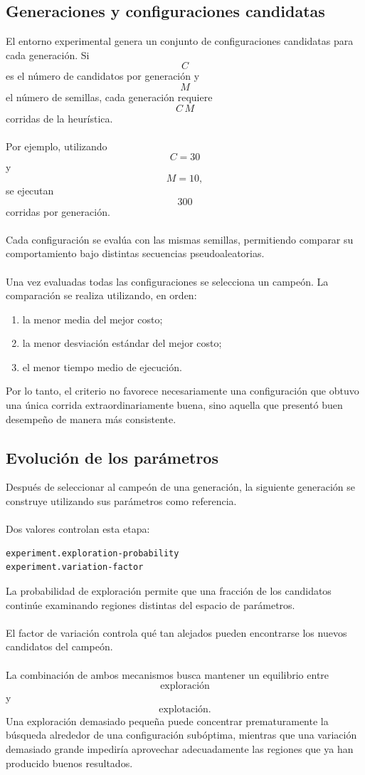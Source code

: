 \documentclass[12pt]{article}
\begin{document}
\subsection{Generaciones y configuraciones candidatas}

El entorno experimental genera un conjunto de configuraciones candidatas
para cada generación.
Si
\[
    C
\]
es el número de candidatos por generación y
\[
    M
\]
el número de semillas, cada generación requiere
\[
    C\,M
\]
corridas de la heurística.
\\\\
Por ejemplo, utilizando
\[
    C=30
\]
y
\[
    M=10,
\]
se ejecutan
\[
    300
\]
corridas por generación.
\\\\
Cada configuración se evalúa con las mismas semillas, permitiendo comparar
su comportamiento bajo distintas secuencias pseudoaleatorias.
\\\\
Una vez evaluadas todas las configuraciones se selecciona un campeón. La
comparación se realiza utilizando, en orden:
\begin{enumerate}
    \item la menor media del mejor costo;
    \item la menor desviación estándar del mejor costo;
    \item el menor tiempo medio de ejecución.
\end{enumerate}
Por lo tanto, el criterio no favorece necesariamente una configuración que
obtuvo una única corrida extraordinariamente buena, sino aquella que
presentó buen desempeño de manera más consistente.

\subsection{Evolución de los parámetros}

Después de seleccionar al campeón de una generación, la siguiente
generación se construye utilizando sus parámetros como referencia.
\\\\
Dos valores controlan esta etapa:
\begin{verbatim}
experiment.exploration-probability
experiment.variation-factor
\end{verbatim}
La probabilidad de exploración permite que una fracción de los candidatos
continúe examinando regiones distintas del espacio de parámetros.
\\\\
El factor de variación controla qué tan alejados pueden encontrarse los
nuevos candidatos del campeón.
\\\\
La combinación de ambos mecanismos busca mantener un equilibrio entre
\[
    \text{exploración}
\]
y
\[
    \text{explotación}.
\]
Una exploración demasiado pequeña puede concentrar prematuramente la
búsqueda alrededor de una configuración subóptima, mientras que una
variación demasiado grande impediría aprovechar adecuadamente las regiones
que ya han producido buenos resultados.
\end{document}
